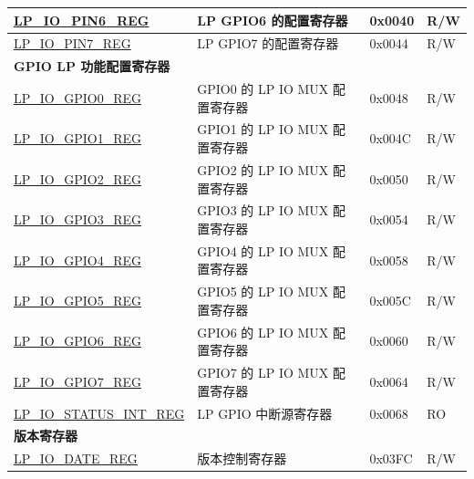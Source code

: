 \begin{longtable}{ | p{6.2cm} | p{7cm} | p{1.3cm} | p{1cm} | }
\hyperref[regdesc:LPIOPINNREG]{LP\_IO\_PIN6\_REG} & LP GPIO6 的配置寄存器 & 0x0040 & R/W \\ \hline
\hyperref[regdesc:LPIOPINNREG]{LP\_IO\_PIN7\_REG} & LP GPIO7 的配置寄存器 & 0x0044 & R/W \\ \hline
\multicolumn{4}{|l|}{\textbf{GPIO LP 功能配置寄存器}} \\ \hline
\hyperref[regdesc:LPIOGPIONREG]{LP\_IO\_GPIO0\_REG} & GPIO0 的 LP IO MUX 配置寄存器 & 0x0048 & R/W \\ \hline
\hyperref[regdesc:LPIOGPIONREG]{LP\_IO\_GPIO1\_REG} & GPIO1 的 LP IO MUX 配置寄存器 & 0x004C & R/W \\ \hline
\hyperref[regdesc:LPIOGPIONREG]{LP\_IO\_GPIO2\_REG} & GPIO2 的 LP IO MUX 配置寄存器 & 0x0050 & R/W \\ \hline
\hyperref[regdesc:LPIOGPIONREG]{LP\_IO\_GPIO3\_REG} & GPIO3 的 LP IO MUX 配置寄存器 & 0x0054 & R/W \\ \hline
\hyperref[regdesc:LPIOGPIONREG]{LP\_IO\_GPIO4\_REG} & GPIO4 的 LP IO MUX 配置寄存器 & 0x0058 & R/W \\ \hline
\hyperref[regdesc:LPIOGPIONREG]{LP\_IO\_GPIO5\_REG} & GPIO5 的 LP IO MUX 配置寄存器 & 0x005C & R/W \\ \hline
\hyperref[regdesc:LPIOGPIONREG]{LP\_IO\_GPIO6\_REG} & GPIO6 的 LP IO MUX 配置寄存器 & 0x0060 & R/W \\ \hline
\hyperref[regdesc:LPIOGPIONREG]{LP\_IO\_GPIO7\_REG} & GPIO7 的 LP IO MUX 配置寄存器 & 0x0064 & R/W \\ \hline
\hyperref[regdesc:LPIOSTATUSINTREG]{LP\_IO\_STATUS\_INT\_REG} & LP GPIO 中断源寄存器 & 0x0068 & RO \\ \hline
\multicolumn{4}{|l|}{\textbf{版本寄存器}} \\ \hline
\hyperref[regdesc:LPIODATEREG]{LP\_IO\_DATE\_REG} & 版本控制寄存器 & 0x03FC & R/W \\ \hline
\end{longtable}
